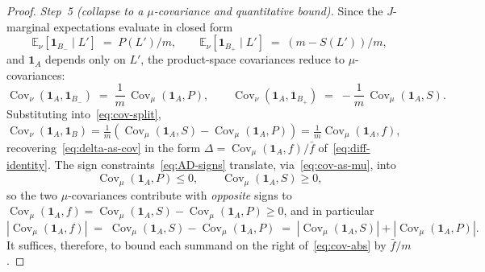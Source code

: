 \begin{proof}
\emph{Step~5 (collapse to a $\mu$-covariance and quantitative bound).}
Since the $J$-marginal expectations evaluate in closed form
\[
  \mathbb E_\nu[\mathbf{1}_{B_-}\mid L'] \;=\; P(L')/m,
  \qquad
  \mathbb E_\nu[\mathbf{1}_{B_+}\mid L'] \;=\; (m-S(L'))/m,
\]
and $\mathbf{1}_A$ depends only on $L'$, the product-space covariances
reduce to $\mu$-covariances:
\begin{equation}\label{eq:cov-as-mu}
  \operatorname{Cov}_\nu(\mathbf{1}_A, \mathbf{1}_{B_-})
   \;=\; \frac{1}{m}\,\operatorname{Cov}_\mu(\mathbf{1}_A, P),
  \qquad
  \operatorname{Cov}_\nu(\mathbf{1}_A, \mathbf{1}_{B_+})
   \;=\; -\frac{1}{m}\,\operatorname{Cov}_\mu(\mathbf{1}_A, S).
\end{equation}
Substituting into~\eqref{eq:cov-split},
$\operatorname{Cov}_\nu(\mathbf{1}_A, \mathbf{1}_B)
 = \frac{1}{m}(\operatorname{Cov}_\mu(\mathbf{1}_A, S)
               - \operatorname{Cov}_\mu(\mathbf{1}_A, P))
 = \frac{1}{m}\operatorname{Cov}_\mu(\mathbf{1}_A, f)$,
recovering~\eqref{eq:delta-as-cov} in the form
$\Delta = \operatorname{Cov}_\mu(\mathbf{1}_A, f)/\bar f$
of~\eqref{eq:diff-identity}. The sign
constraints~\eqref{eq:AD-signs} translate, via~\eqref{eq:cov-as-mu},
into
\begin{equation}\label{eq:mu-signs}
  \operatorname{Cov}_\mu(\mathbf{1}_A, P) \le 0,
  \qquad
  \operatorname{Cov}_\mu(\mathbf{1}_A, S) \ge 0,
\end{equation}
so the two $\mu$-covariances contribute with \emph{opposite} signs
to $\operatorname{Cov}_\mu(\mathbf{1}_A, f)
 = \operatorname{Cov}_\mu(\mathbf{1}_A, S) - \operatorname{Cov}_\mu(\mathbf{1}_A, P) \ge 0$,
and in particular
\begin{equation}\label{eq:cov-abs}
  |\operatorname{Cov}_\mu(\mathbf{1}_A, f)|
  \;=\; \operatorname{Cov}_\mu(\mathbf{1}_A, S)
       - \operatorname{Cov}_\mu(\mathbf{1}_A, P)
  \;=\; |\operatorname{Cov}_\mu(\mathbf{1}_A, S)|
       + |\operatorname{Cov}_\mu(\mathbf{1}_A, P)|.
\end{equation}
It suffices, therefore, to bound each summand on the right
of~\eqref{eq:cov-abs} by $\bar f/m$.


\end{proof}
